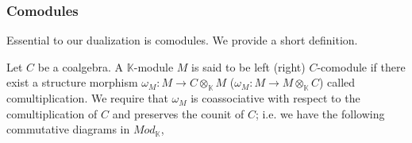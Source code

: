 \documentclass[../thesis.tex]{subfiles}
\begin{document}
            \subsubsection*{Comodules}

                Essential to our dualization is comodules. We provide a short definition.

                \begin{definition}[Comodules]
                    Let $C$ be a coalgebra. A $\mathbb{K}$-module $M$ is said to be left (right) $C$-comodule if there exist a structure morphism $\omega_M: M \rightarrow C\otimes_{\mathbb{K}}M$ ($\omega_M: M \rightarrow M\otimes_{\mathbb{K}}C$) called comultiplication. We require that $\omega_M$ is coassociative with respect to the comultiplication of $C$ and preserves the counit of $C$; i.e. we have the following commutative diagrams in $Mod_\mathbb{K}$,
                    \begin{center}
                    \end{center}
                    

        
        

\end{definition}
\end{document}
